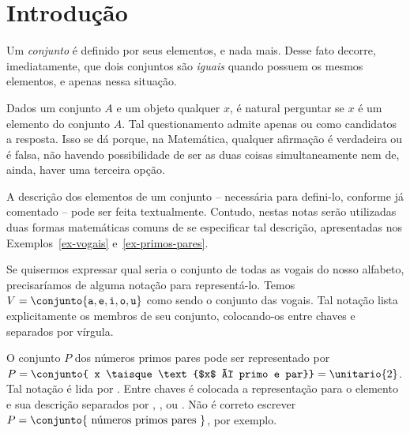 \section{Introdução}
\label{sec:intro}

Um \emph{conjunto} é definido por seus elementos, e nada mais.
Desse fato decorre, imediatamente, que dois conjuntos são \emph{iguais} quando possuem os mesmos elementos, e apenas nessa situação. 

Dados um conjunto $A$ e um objeto qualquer $x$, é natural perguntar se $x$ é um elemento do conjunto $A$. Tal questionamento admite apenas  ou  como candidatos a resposta. Isso se dá porque, na Matemática, qualquer afirmação é verdadeira ou é falsa, não havendo possibilidade de ser as duas coisas simultaneamente nem de, ainda, haver uma terceira opção. 


A descrição dos elementos de um conjunto -- necessária para defini-lo, conforme já comentado -- pode ser feita textualmente. Contudo, nestas notas serão utilizadas duas formas matemáticas comuns de se especificar tal descrição, apresentadas nos Exemplos~\ref{ex-vogais} e~\ref{ex-primos-pares}. 

\begin{example}
    \label{ex-vogais}
    Se quisermos expressar qual seria o conjunto de todas as vogais do nosso alfabeto, precisaríamos de alguma notação para representá-lo. Temos $V = \conjunto{\texttt a, \texttt e, \texttt i, \texttt o, \texttt u}$ como sendo o conjunto das vogais. Tal notação lista explicitamente os membros de seu conjunto, colocando-os entre chaves e separados por vírgula.
\end{example}

\begin{example}
    \label{ex-primos-pares}
    O conjunto $P$ dos números primos pares pode ser representado por $P = \conjunto{ x \taisque \text{$x$ é primo e par}} = \unitario{2}$. Tal notação é lida por . Entre chaves é colocada a representação para o elemento e sua descrição separados por \entreaspas{;}, \entreaspas{\contrabarra}, ou \entreaspas{|}.  Não é correto escrever $P = \conjunto{\text{ números primos pares }}$, por exemplo.
\end{example}

